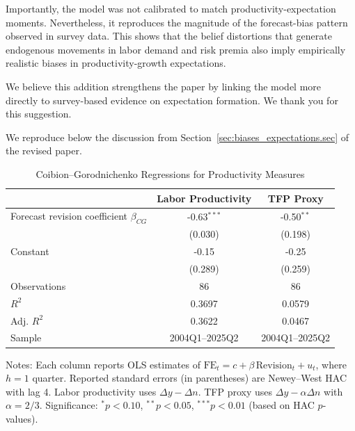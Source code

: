 \documentclass[12pt,a4paper]{article}
\newcommand{\changesbox}[1]{
	\noindent\vspace{-8pt}
\begin{mdframed}[style=manuscript] 
	#1
\end{mdframed}}
\begin{document}
Importantly, the model was not calibrated to match productivity-expectation moments.
Nevertheless, it reproduces the magnitude of the forecast-bias pattern observed in survey data.
This shows that the belief distortions that generate endogenous movements in
labor demand and risk premia also imply empirically realistic biases
in productivity-growth expectations.

We believe this addition strengthens the paper by linking the model more directly
to survey-based evidence on expectation formation.
We thank you for this suggestion.

We reproduce below the discussion from Section~\ref{sec:biases_expectations.sec} of the revised paper.

\changesbox{
    \quoting{ProdExpectationII}
}

\begin{table}[!t]
    \centering
    \caption{Coibion--Gorodnichenko Regressions for Productivity Measures}
    \label{tab:cg_productivity_letter}
    \begin{threeparttable}
    \begin{tabular}{lcc}
    \toprule
     & Labor Productivity & TFP Proxy \\
    \midrule
    Forecast revision coefficient $\beta_{CG}$ 
    & -0.63$^{***}$ 
    & -0.50$^{**}$ \\
    & (0.030) & (0.198) \\
    Constant 
    & -0.15 
    & -0.25 \\
    & (0.289) & (0.259) \\
    \midrule
    Observations 
    & 86 & 86 \\
    $R^2$ 
    & 0.3697 & 0.0579 \\
    Adj. $R^2$ 
    & 0.3622 & 0.0467 \\
    Sample 
    & 2004Q1--2025Q2 & 2004Q1--2025Q2 \\
    \bottomrule
    \end{tabular}
    \begin{tablenotes}[flushleft]
    \footnotesize
    \item Notes: Each column reports OLS estimates of
    $\text{FE}_t = c + \beta \,\text{Revision}_t + u_t$, where $h=1$ quarter.
    Reported standard errors (in parentheses) are Newey--West HAC with lag 4.
    Labor productivity uses $\Delta y - \Delta n$.
    TFP proxy uses $\Delta y - \alpha \Delta n$ with $\alpha=2/3$.
    Significance: $^{*} p<0.10$, $^{**} p<0.05$, $^{***} p<0.01$ (based on HAC $p$-values).
    \end{tablenotes}
    \end{threeparttable}
    \end{table}
\end{document}
